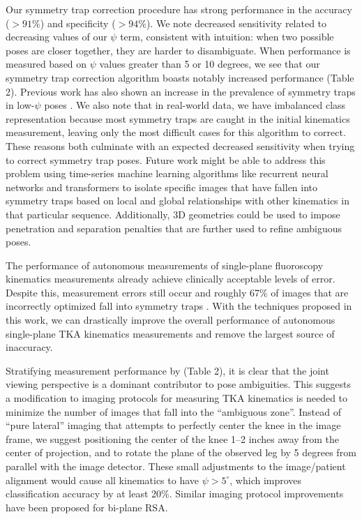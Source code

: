 {Our symmetry trap correction procedure has strong performance in the accuracy ($>91\%$) and specificity ($>94\%$).
We note decreased sensitivity related to decreasing values of our $\psi$ term, consistent with intuition: when two possible poses are closer together, they are harder to disambiguate.
When performance is measured based on $\psi$ values greater than 5 or 10 degrees, we see that our symmetry trap correction algorithm boasts notably increased performance (Table 2).
Previous work has also shown an increase in the prevalence of symmetry traps in low-$\psi$ poses \cite{jensenJointTrackMachine2023}.
We also note that in real-world data, we have imbalanced class representation because most symmetry traps are caught in the initial kinematics measurement, leaving only the most difficult cases for this algorithm to correct.
These reasons both culminate with an expected decreased sensitivity when trying to correct symmetry trap poses.
Future work might be able to address this problem using time-series machine learning algorithms like recurrent neural networks \cite{hochreiterLongShortTermMemory1997} and transformers \cite{vaswaniAttentionAllYou2017} to isolate specific images that have fallen into symmetry traps based on local and global relationships with other kinematics in that particular sequence.
Additionally, 3D geometries could be used to impose penetration and separation penalties that are further used to refine ambiguous poses.


The performance of autonomous measurements of single-plane fluoroscopy kinematics measurements already achieve clinically acceptable levels of error.
Despite this, measurement errors still occur and roughly 67\% of images that are incorrectly optimized fall into symmetry traps \cite{jensenJointTrackMachine2023,brobergValidationMachineLearning2023}.
With the techniques proposed in this work, we can drastically improve the overall performance of autonomous single-plane TKA kinematics measurements and remove the largest source of inaccuracy.


Stratifying measurement performance by  (Table 2), it is clear that the joint viewing perspective is a dominant contributor to pose ambiguities.
This suggests a modification to imaging protocols for measuring TKA kinematics is needed to minimize the number of images that fall into the “ambiguous zone”.
Instead of “pure lateral” imaging that attempts to perfectly center the knee in the image frame, we suggest positioning the center of the knee 1–2 inches away from the center of projection, and to rotate the plane of the observed leg by 5 degrees from parallel with the image detector.
These small adjustments to the image/patient alignment would cause all kinematics to have $\psi > 5^{\circ}$, which improves classification accuracy by at least 20\%. Similar imaging protocol improvements have been proposed for bi-plane RSA\cite{niesenReorientingTibialBaseplate2020}.

}
